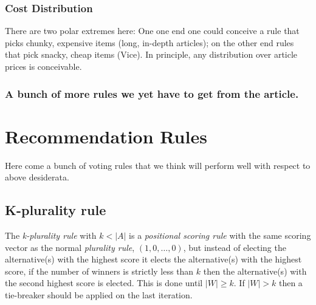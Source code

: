 \documentclass{article}
\begin{document}
\subsubsection{Cost Distribution}
There are two polar extremes here:
One one end one could conceive a rule that picks chunky, expensive items (long, in-depth articles);
 on the other end rules that pick snacky, cheap items (Vice).
 In principle, any distribution over article prices is conceivable.
 \subsubsection{A bunch of more rules we yet have to get from the article.} 


\section{Recommendation Rules}

Here come a bunch of voting rules that we think will perform well with respect to above desiderata.





\subsection{K-plurality rule}

The {\em k-plurality rule} with $k<|A|$ is a {\em positional scoring rule} with the same scoring vector as the normal
{\em plurality rule}, $(1,0, \dots, 0)$, but instead of electing the alternative(s) with the highest score it elects the
alternative(s) with the highest score, if the number of winners is strictly less than $k$ then the alternative(s) with
the second highest score is elected. This is done until $|W| \geq k$. If $|W| > k$ then a tie-breaker should be applied
on the last iteration.
\end{document}
